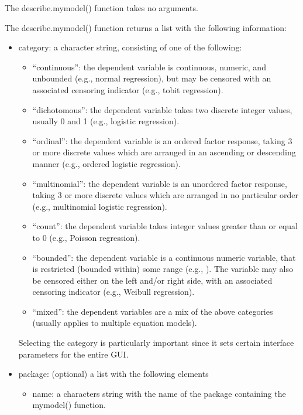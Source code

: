 \documentclass[letterpaper,10pt,english]{sphinxmanual}
\begin{document}
The describe.mymodel() function takes no arguments.

The describe.mymodel() function returns a list with the following
information:
\begin{itemize}
\item {} 
category: a character string, consisting of one of the following:
\begin{itemize}
\item {} 
“continuous”: the dependent variable is continuous, numeric, and
unbounded (e.g., normal regression), but may be censored with an
associated censoring indicator (e.g., tobit regression).

\item {} 
“dichotomous”: the dependent variable takes two discrete integer
values, usually 0 and 1 (e.g., logistic regression).

\item {} 
“ordinal”: the dependent variable is an ordered factor response,
taking 3 or more discrete values which are arranged in an
ascending or descending manner (e.g., ordered logistic
regression).

\item {} 
“multinomial”: the dependent variable is an unordered factor
response, taking 3 or more discrete values which are arranged in
no particular order (e.g., multinomial logistic regression).

\item {} 
“count”: the dependent variable takes integer values greater than
or equal to 0 (e.g., Poisson regression).

\item {} 
“bounded”: the dependent variable is a continuous numeric
variable, that is restricted (bounded within) some range (e.g.,
). The variable may also be censored either on
the left and/or right side, with an associated censoring indicator
(e.g., Weibull regression).

\item {} 
“mixed”: the dependent variables are a mix of the above categories
(usually applies to multiple equation models).

\end{itemize}

Selecting the category is particularly important since it sets
certain interface parameters for the entire GUI.

\item {} 
package: (optional) a list with the following elements
\begin{itemize}
\item {} 
name: a characters string with the name of the package containing
the mymodel() function.


\end{itemize}
\end{itemize}
\end{document}
